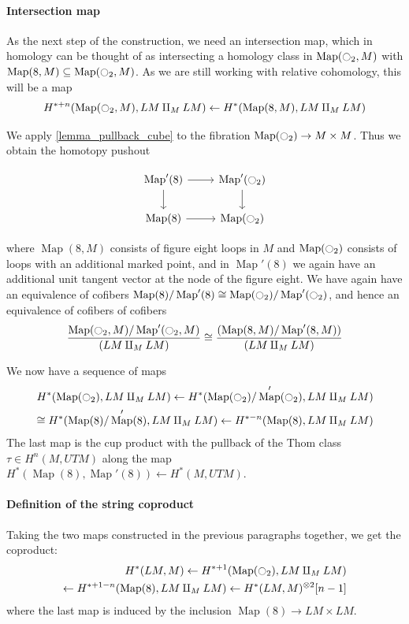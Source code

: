 \documentclass{scrartcl}
\theoremstyle{plain}
\theoremstyle{definition}
\renewcommand{\subset}{\subseteq}
\newcommand{\iso}{\cong}
\newcommand{\from}{\leftarrow}
\DeclareMathOperator{\Map}{Map}
\renewcommand{\coprod}{\mathbin{\amalg}}
\begin{document}
\paragraph{Intersection map} 
As the next step of the construction, we need an intersection map, which in homology can be thought of as intersecting a homology class in $\Map(\ocircle_2, M)$ with $\Map(8, M) \subset \Map(\ocircle_2, M)$. As we are still working with relative cohomology, this will be a map
\begin{align*}
    H^{*+n}(\Map(\ocircle_2, M), LM\coprod_M LM) \from H^*(\Map(8, M), LM \coprod_M LM)
\end{align*}

We apply \ref{lemma_pullback_cube} to the fibration $\Map(\ocircle_2)\to M\times M$. Thus we obtain the homotopy pushout

\begin{equation}
    \begin{tikzcd}
        \Map'(8) \rar\dar &\Map'(\ocircle_2)\dar \\
        \Map(8) \rar & \Map(\ocircle_2)
    \end{tikzcd}
\end{equation}

where $\Map(8, M)$ consists of figure eight loops in $M$ and $\Map(\ocircle_2)$ consists of loops with an additional marked point, and in $\Map'(8)$ we again have an additional unit tangent vector at the node of the figure eight. We have again have an equivalence of cofibers $\Map(8) / \Map'(8) \iso \Map(\ocircle_2)/\Map'(\ocircle_2)$, and hence an equivalence of cofibers of cofibers
\begin{align*}
    \frac{\Map(\ocircle_2,M) / \Map'(\ocircle_2, M)} {(LM \coprod_M LM) } \iso \frac{(\Map(8,M) / \Map'(8, M)) }{(LM \coprod_M LM)}
\end{align*}

We now have a sequence of maps 
\begin{align*}
    H^*(\Map(\ocircle_2), LM\coprod_M LM) \from H^*(\Map(\ocircle_2)/ \Map'(\ocircle_2), LM\coprod_M LM) \\ \iso H^*(\Map(8) / \Map'(8), LM \coprod_M LM) \from H^{*-n}(\Map(8), LM \coprod_M LM)
\end{align*}
The last map is the cup product with the pullback of the Thom class $\tau\in H^n(M, UTM)$ along the map $H^*(\Map(8), \Map'(8)) \from H^*(M, UTM)$.

\paragraph{Definition of the string coproduct} Taking the two maps constructed in the previous paragraphs together, we get the coproduct:
\begin{align*}
    H^*(LM, M) \from H^{*+1}(\Map(\ocircle_2), LM \coprod_M LM) \\
    \from H^{*+1-n}(\Map(8), LM\coprod_M LM) \from H^*(LM, M)^{\otimes 2}[n-1]
\end{align*}
where the last map is induced by the inclusion $\Map(8)\to LM\times LM$.
\end{document}
